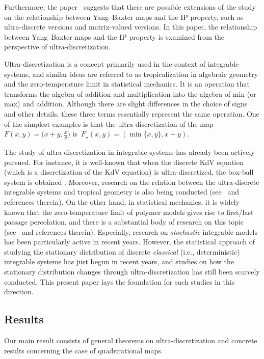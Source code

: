 \documentclass[pdftex]{sigma}
\numberwithin{equation}{section}
\begin{document}
Furthermore, the paper~\cite{SU} suggests that there are possible extensions of the study on the relationship between Yang--Baxter maps and the IP property, such as ultra-discrete versions and matrix-valued versions. In this paper, the relationship between Yang--Baxter maps and the IP property is examined from the perspective of ultra-discretization.

Ultra-discretization is a concept primarily used in the context of integrable systems, and similar ideas are referred to as tropicalization in algebraic geometry and the zero-temperature limit in statistical mechanics. It is an operation that transforms the algebra of addition and multiplication into the algebra of min (or max) and addition. Although there are slight differences in the choice of signs and other details, these three terms essentially represent the same operation. One of the simplest examples is that the ultra-discretization of the map $F(x,y)=\bigl(x+y,\frac{x}{y}\bigr)$ is~${F_{\star}(x,y)=(\min\{x,y\},x-y)}$.

The study of ultra-discretization in integrable systems has already been actively pursued. For instance, it is well-known that when the discrete KdV equation (which is a discretization of the KdV equation) is ultra-discretized, the box-ball system is obtained \cite{Inoue_2012, TH98}. Moreover, research on the relation between the ultra-discrete integrable systems and tropical geometry is also being conducted (see~\cite{Inoue_2012} and references therein). On the other hand, in statistical mechanics, it is widely known that the zero-temperature limit of polymer models gives rise to first/last passage percolation, and there is a substantial body of research on this topic (see~\cite{CSjsp} and references therein). Especially, research on \textit{stochastic} integrable models has been particularly active in recent years. However, the statistical approach of studying the stationary distribution of discrete \textit{classical} (i.e., deterministic) integrable systems has just begun in recent years, and studies on how the stationary distribution changes through ultra-discretization has still been scarcely conducted. This present paper lays the foundation for such studies in this direction.

\subsection{Results}

Our main result consists of general theorems on ultra-discretization and concrete results concerning the case of quadrirational maps.
\end{document}
